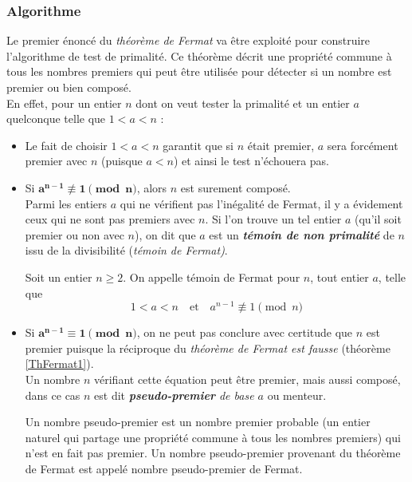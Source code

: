 	\subsubsection{Algorithme}
		Le premier énoncé du \textit{théorème de Fermat} va être exploité pour construire l'algorithme de test de primalité. Ce théorème décrit une propriété commune à tous les nombres premiers qui peut être utilisée pour détecter si un nombre est premier ou bien composé.\\
		\indent En effet, pour un entier $n$ dont on veut tester la primalité et un entier $a$ quelconque telle que $1 < a < n$ : 
		\begin{itemize}
			\item Le fait de choisir $1 < a < n$ garantit que si $n$ était premier, $a$ sera forcément premier avec $n$ (puisque $a < n$) et ainsi le test n'échouera pas. 
			\item Si $\mathbf{a^{n-1} \not\equiv 1 \pmod n}$, alors $n$ est surement composé.\\
			Parmi les entiers $a$ qui ne vérifient pas l'inégalité de Fermat, il y a évidement ceux qui ne sont pas premiers avec $n$. Si l'on trouve un tel entier $a$ (qu'il soit premier ou non avec $n$), on dit que $a$ est un \textit{\textbf{témoin de non primalité}} de $n$ issu de la divisibilité (\textit{témoin de Fermat)}.
					
					\vspace{-1.5em}\begin{adjustwidth}{1.5cm}{1.5cm} 
					\begin{Def}
						\label{TemFermat}
						Soit un entier $n \geqslant 2$. On appelle témoin de Fermat pour $n$, tout entier $a$, telle que
						\[1 < a < n  \quad \text{et} \quad a^{n-1} \not\equiv 1 \pmod n\]
					\end{Def}
					\end{adjustwidth}\vspace{0.5em}
					
			\item Si $\mathbf{a^{n-1}\equiv 1 \pmod n}$, on ne peut pas conclure avec certitude que $n$ est premier puisque la réciproque du \textit{théorème de Fermat est fausse} (théorème \ref{ThFermat1}).\\
				Un nombre $n$ vérifiant cette équation peut être premier, mais aussi composé, dans ce cas $n$ est dit \textit{\textbf{pseudo-premier} de base $a$} ou menteur.
					
					\vspace{-1.5em}\begin{adjustwidth}{1.5cm}{1.5cm} 
					\begin{Def}
						\label{PseudoPrem}
						Un nombre pseudo-premier est un nombre premier probable (un entier naturel qui partage une propriété commune à tous les nombres premiers) qui n'est en fait pas premier. Un nombre pseudo-premier provenant du théorème de Fermat est appelé nombre pseudo-premier de Fermat.
					\end{Def}
					\end{adjustwidth}\vspace{0.5em}
					

\end{itemize}
